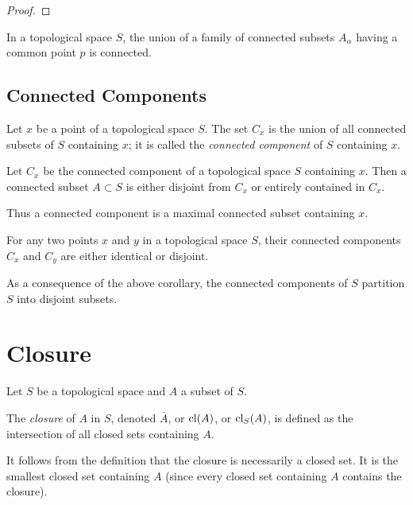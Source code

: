 \begin{proof}

\end{proof}

\begin{proposition}
	In a topological space $S$, the union of a family of connected subsets
	$A_\alpha$ having a common point $p$ is connected.
\end{proposition}

\subsection{Connected Components}
Let $x$ be a point of a topological space $S$. The set $C_x$ is the union of
all connected subsets of $S$ containing $x$; it is called the \emph{connected
	component} of $S$ containing $x$.


  \begin{proposition}
	Let $C_x$ be the connected component of a topological space $S$
	containing $x$. Then a connected subset $A\subset S$ is either disjoint
	from $C_x$ or entirely contained in $C_x$.
\end{proposition}

Thus a connected component is a maximal connected subset containing $x$.


\begin{corollary}
	For any two points $x$ and $y$ in a topological space $S$, their
	connected components $C_x$ and $C_y$ are either identical or disjoint.
\end{corollary}

As a consequence of the above corollary, the connected components of $S$
partition $S$ into disjoint subsets.




\section{Closure}
Let $S$ be a topological space and $A$ a subset of $S$.

\begin{definition}[Closure]
	The \emph{closure} of $A$ in $S$, denoted $\overline{A}$, or $\operatorname{cl}(A)$,
	or $\operatorname{cl}_S(A)$, is defined as the intersection of all closed sets
	containing $A$.
\end{definition}

It follows from the definition that the closure is necessarily a closed set.
It is the smallest closed set containing $A$ (since every closed set
containing $A$ contains the closure).


